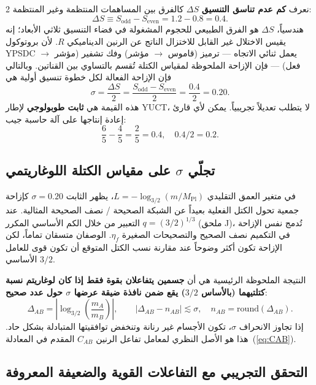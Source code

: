 \documentclass[11pt,a4paper]{article}
\begin{document}
\begin{multicols}{2}
		نعرف \textbf{كم عدم تناسق التنسيق} \(\Delta S\) كالفرق بين المساهمات المنتظمة وغير المنتظمة:
		\begin{equation}
			\Delta S \equiv S_{\mathrm{odd}} - S_{\mathrm{even}} = 1.2 - 0.8 = 0.4.
			\label{eq:Deltas}
		\end{equation}
		هندسياً، \(\Delta S\) هو الفرق الطبيعي للحجوم المشغولة في فضاء التنسيق ثلاثي الأبعاد؛ إنه يقيس الاختلال غير القابل للاختزال الناتج عن الرنين الديناميكي \(R\). لأن بروتوكول YPSDC يعمل ثنائي الاتجاه — ترميز (قاموس \(\to\) مؤشر) وفك تشفير (مؤشر \(\to\) فعل) — فإن الإزاحة الملحوظة لمقياس الكتلة تُقسم بالتساوي بين القناتين. وبالتالي فإن الإزاحة الفعالة لكل خطوة تنسيق أولية هي
		\begin{equation}
			\boxed{\sigma = \frac{\Delta S}{2} = \frac{S_{\mathrm{odd}} - S_{\mathrm{even}}}{2} = \frac{0.4}{2} = 0.20.}
			\label{eq:sigma}
		\end{equation}
		هذه القيمة هي \textbf{ثابت طوبولوجي} لإطار YUCT، لا يتطلب تعديلاً تجريبياً. يمكن لأي قارئ إعادة إنتاجها على آلة حاسبة جيب:
		\[
		\frac{6}{5} - \frac{4}{5} = \frac{2}{5} = 0.4,\quad 0.4 / 2 = 0.2.
		\]
		
		\subsection{تجلّي \(\sigma\) على مقياس الكتلة اللوغاريتمي}
		
		في متغير العمق التقليدي \(L = -\log_{3/2}(m/M_{\mathrm{Pl}})\)، يظهر الثابت \(\sigma = 0.20\) كإزاحة جمعية تحول الكتل الفعلية بعيداً عن الشبكة الصحيحة / نصف الصحيحة المثالية. عند التعبير من خلال الكم الأساسي المكرر \(q = (3/2)^{1/3}\) (ملحق J)، تُدمج نفس الإزاحة في التكميم نصف الصحيح والتصحيحات الصغيرة \(\eta_f\). الوصفان متسقان تماماً، لكن الإزاحة تكون أكثر وضوحاً عند مقارنة نسب الكتل المتوقع أن تكون قوى للعامل الأساسي \(3/2\).
		
		النتيجة الملحوظة الرئيسية هي أن \textbf{جسمين يتفاعلان بقوة فقط إذا كان لوغاريتم نسبة كتلتيهما (بالأساس \(3/2\)) يقع ضمن نافذة ضيقة عرضها \(\sigma\) حول عدد صحيح}:
		\[
		\Delta_{AB} = \left| \log_{3/2}\left( \frac{m_A}{m_B} \right) \right|,\qquad
		|\Delta_{AB} - n_{AB}| \lesssim \sigma,\quad n_{AB} = \text{round}(\Delta_{AB}).
		\]
		إذا تجاوز الانحراف \(\sigma\)، تكون الأجسام غير رنانة وتنخفض توافقيتها المتبادلة بشكل حاد. هذا هو الأصل النظري لمعامل تفاعل الرنين \(C_{AB}\) المقدم في المعادلة~(\ref{eq:CAB}).
		
		\subsection{التحقق التجريبي مع التفاعلات القوية والضعيفة المعروفة}
		

\end{multicols}
\end{document}
